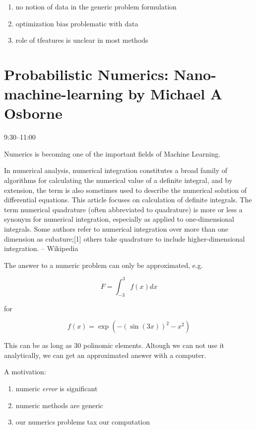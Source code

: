 \documentclass[b5paper]{report}
\begin{document}
\begin{enumerate}
  \item no notion of data in the generic problem formulation
  \item optimization bias problematic with data
  \item role of tfeatures is unclear in most methods
\end{enumerate}

\chapter{Probabilistic Numerics: Nano-machine-learning by Michael A Osborne}

9:30--11:00

Numerics is becoming one of the important fields of Machine Learning.

\begin{mybox}
  In numerical analysis, numerical integration constitutes a broad family of
  algorithms for calculating the numerical value of a definite integral, and by
  extension, the term is also sometimes used to describe the numerical solution
  of differential equations. This article focuses on calculation of definite
  integrals. The term numerical quadrature (often abbreviated to quadrature) is
  more or less a synonym for numerical integration, especially as applied to
  one-dimensional integrals. Some authors refer to numerical integration over
  more than one dimension as cubature;[1] others take quadrature to include
  higher-dimensional integration. -- Wikipedia
\end{mybox}

The answer to a numeric problem can only be approximated, e.g.

\begin{equation}
  F = \int_{-3}^3 f(x) dx
\end{equation}

for

\begin{equation}
  f(x) = \exp(-(\sin(3x))^2 - x^2)
\end{equation}

This can be as long as 30 polinomic elements. Altough we can not use it
analytically, we can get an approximated answer with a computer.

A motivation:

\begin{enumerate}
  \item numeric \emph{error} is significant
  \item numeric methods are generic
  \item our numerics problems tax our computation
\end{enumerate}
\end{document}
